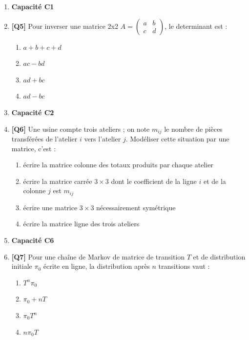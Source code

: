 \begin{enumerate}
\item[] \textbf{Capacité C1}

\item \textbf{[Q5]} Pour inverser une matrice 2x2 $A = \begin{pmatrix} a & b \\ c & d \end{pmatrix}$, le determinant est :
  \begin{enumerate}[label=\Alph*.]
    \item $a+b+c+d$
    \item $ac - bd$
    \item $ad + bc$
    \item $ad - bc$
  \end{enumerate}

\item[] \textbf{Capacité C2}

\item \textbf{[Q6]} Une usine compte trois ateliers ; on note $m_{ij}$ le nombre de pièces transférées de l'atelier $i$ vers l'atelier $j$. Modéliser cette situation par une matrice, c'est :
  \begin{enumerate}[label=\Alph*.]
    \item écrire la matrice colonne des totaux produits par chaque atelier
    \item écrire la matrice carrée $3\times3$ dont le coefficient de la ligne $i$ et de la colonne $j$ est $m_{ij}$
    \item écrire une matrice $3\times3$ nécessairement symétrique
    \item écrire la matrice ligne des trois ateliers
  \end{enumerate}

\item[] \textbf{Capacité C6}

\item \textbf{[Q7]} Pour une chaîne de Markov de matrice de transition $T$ et de distribution initiale $\pi_0$ écrite en ligne, la distribution après $n$ transitions vaut :
  \begin{enumerate}[label=\Alph*.]
    \item $T^n\pi_0$
    \item $\pi_0+nT$
    \item $\pi_0T^n$
    \item $n\pi_0T$
  \end{enumerate}

\end{enumerate}

